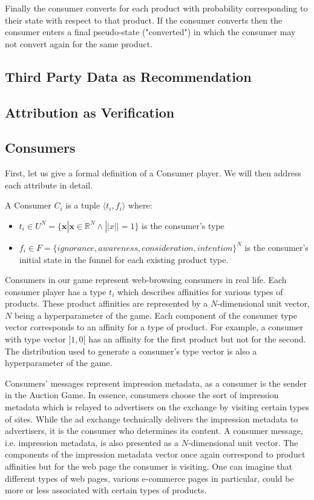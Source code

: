 \documentclass{article}
\begin{document}
Finally the consumer converts for each product with probability corresponding to their state with respect to that product. If the consumer converts then the consumer enters a final pseudo-state ("converted") in which the consumer may not convert again for the same product.

\subsection{Third Party Data as Recommendation}

\subsection{Attribution as Verification}

\subsection{Consumers}

First, let us give a formal definition of a Consumer player. We will then address each attribute in detail.

A Consumer $C_i$ is a tuple $\langle t_i, f_i \rangle$ where:

\begin{itemize}
	\item $t_i \in U^N = \{\bm{x} | \bm{x} \in \mathbb{R}^N \wedge ||x|| = 1\}$ is the consumer's type
	\item $f_i \in F = \{ignorance, awareness, consideration, intention\}^N$ is the consumer's initial state in the funnel for each existing product type. 
\end{itemize}

Consumers in our game represent web-browsing consumers in real life. Each consumer player has a type $t_i$ which describes affinities for various types of products. These product affinities are represented by a $N$-dimensional unit vector, $N$ being a hyperparameter of the game. Each component of the consumer type vector corresponds to an affinity for a type of product. For example, a consumer with type vector $\rbrack 1, 0 \lbrack$ has an affinity for the first product but not for the second. The distribution used to generate a consumer's type vector is also a hyperparameter of the game.

Consumers' messages represent impression metadata, as a consumer is the sender in the Auction Game. In essence, consumers choose the sort of impression metadata which is relayed to advertisers on the exchange by visiting certain types of sites. While the ad exchange technically delivers the impression metadata to advertisers, it is the consumer who determines its content. A consumer message, i.e. impression metadata, is also presented as a $N$-dimensional unit vector. The components of the impression metadata vector once again correspond to product affinities but for the web page the consumer is visiting. One can imagine that different types of web pages, various e-commerce pages in particular, could be more or less associated with certain types of products. 
\end{document}
